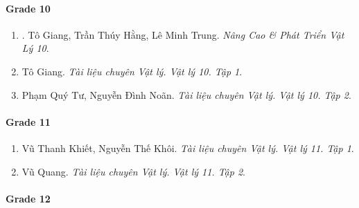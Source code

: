 \documentclass{article}
\begin{document}
\paragraph{Grade 10}

\begin{enumerate}
	\item \cite{Giang_Hang_Trung_ncpt_Vat_Ly_10}. Tô Giang, Trần Thúy Hằng, Lê Minh Trung. {\it Nâng Cao \& Phát Triển Vật Lý 10}.\hfill{\sf[reading]}
	
	\item Tô Giang. {\it Tài liệu chuyên Vật lý. Vật lý 10. Tập 1}.
	
	\item Phạm Quý Tư, Nguyễn Đình Noãn. {\it Tài liệu chuyên Vật lý. Vật lý 10. Tập 2}.
\end{enumerate}

\paragraph{Grade 11}

\begin{enumerate}
	\item Vũ Thanh Khiết, Nguyễn Thế Khôi. {\it Tài liệu chuyên Vật lý. Vật lý 11. Tập 1}.
	
	\item Vũ Quang. {\it Tài liệu chuyên Vật lý. Vật lý 11. Tập 2}.
\end{enumerate}

\paragraph{Grade 12}
\end{document}
